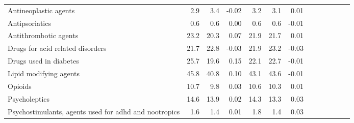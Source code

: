\documentclass[11pt,]{article}
\begin{document}
\begin{longtable}{lrrrrrrrrrrrr}
      Antineoplastic agents &  2.9 &  3.4 & -0.02 &  3.2 &  3.1 &  0.01 \\ 
      Antipsoriatics &  0.6 &  0.6 &  0.00 &  0.6 &  0.6 & -0.01 \\ 
      Antithrombotic agents & 23.2 & 20.3 &  0.07 & 21.9 & 21.7 &  0.01 \\ 
      Drugs for acid related disorders & 21.7 & 22.8 & -0.03 & 21.9 & 23.2 & -0.03 \\ 
      Drugs used in diabetes & 25.7 & 19.6 &  0.15 & 22.1 & 22.7 & -0.01 \\ 
      Lipid modifying agents & 45.8 & 40.8 &  0.10 & 43.1 & 43.6 & -0.01 \\ 
      Opioids & 10.7 &  9.8 &  0.03 & 10.6 & 10.3 &  0.01 \\ 
      Psycholeptics & 14.6 & 13.9 &  0.02 & 14.3 & 13.3 &  0.03 \\ 
      Psychostimulants, agents used for adhd and nootropics &  1.6 &  1.4 &  0.01 &  1.8 &  1.4 &  0.03 \\ 
   \bottomrule\end{longtable}
\clearpage
{}
\end{document}
